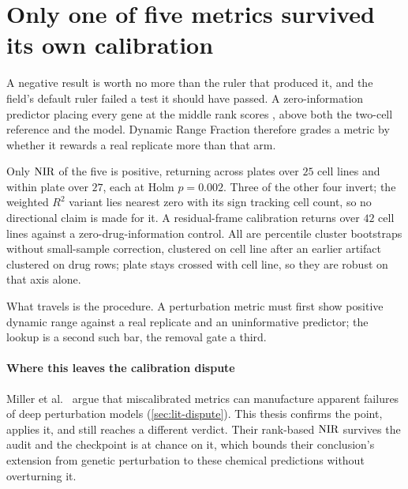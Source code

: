 \section{Only one of five metrics survived its own calibration}

A negative result is worth no more than the ruler that produced it, and the
field's default ruler failed a test it should have passed. A zero-information
predictor placing every gene at the middle rank scores
, above both the two-cell reference and
the model. Dynamic Range Fraction therefore grades a metric by whether it rewards
a real replicate more than that arm.

Only $\textrm{NIR}$ of the five is positive, returning  across
plates over $25$ cell lines and  within plate over
$27$, each at Holm $p=0.002$. Three of the other four invert; the weighted $R^2$
variant lies nearest zero with its sign tracking cell count, so no directional
claim is made for it. A residual-frame calibration returns
 over $42$ cell lines against a zero-drug-information
control. All are percentile cluster bootstraps without small-sample correction,
clustered on cell line after an earlier artifact clustered on drug
rows; plate stays crossed with cell
line, so they are robust on that axis alone.

What travels is the procedure. A perturbation metric must first show positive
dynamic range against a real replicate and an uninformative predictor; the lookup
is a second such bar, the removal gate a third.

\paragraph{Where this leaves the calibration dispute} Miller et
al.~\cite{miller} argue that miscalibrated metrics can manufacture apparent
failures of deep perturbation models (\cref{sec:lit-dispute}). This thesis
confirms the point, applies it, and still reaches a different verdict. Their
rank-based $\textrm{NIR}$ survives the audit and the checkpoint is at chance on it, which
bounds their conclusion's extension from genetic perturbation to these chemical
predictions without overturning it.

